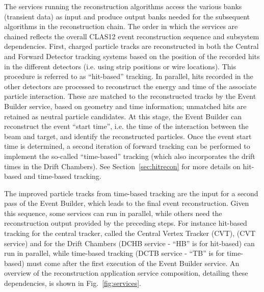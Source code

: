 The services running the reconstruction algorithms access the various banks (transient data) as input and produce
output banks needed for the subsequent algorithms in the reconstruction chain. The order in which the services are
chained reflects the overall CLAS12 event reconstruction sequence and subsystem dependencies. First, charged
particle tracks are reconstructed in both the Central and Forward Detector tracking systems based on the position
of the recorded hits in the different detectors (i.e. using strip positions or wire locations). This procedure is
referred to as ``hit-based'' tracking. In parallel, hits recorded in the other detectors are processed to reconstruct
the energy and time of the associate particle interaction. These are matched to the reconstructed tracks by the
Event Builder service, based on geometry and time information; unmatched hits are retained as neutral particle
candidates. At this stage, the Event Builder can reconstruct the event ``start time'', i.e. the time of the interaction
between the beam and target, and identify the reconstructed particles. Once the event start time is determined, a
second iteration of forward tracking can be performed to implement the so-called ``time-based'' tracking (which
also incorporates the drift times in the Drift Chambers). See Section~\ref{sec:hitrecon} for more details on
hit-based and time-based tracking.

The improved particle tracks from time-based tracking are the input for a second pass of the Event Builder, which
leads to the final event reconstruction. Given this sequence, some services can run in parallel, while others need the
reconstruction output provided by the preceding steps. For instance hit-based tracking for the central tracker, called
the Central Vertex Tracker (CVT), (CVT service) and for the Drift Chambers (DCHB service - ``HB'' is for
hit-based) can run in parallel, while time-based tracking (DCTB service - ``TB'' is for time-based) must come after
the first execution of the Event Builder service. An overview of the reconstruction application service composition,
detailing these dependencies, is shown in Fig.~\ref{fig:services}.
